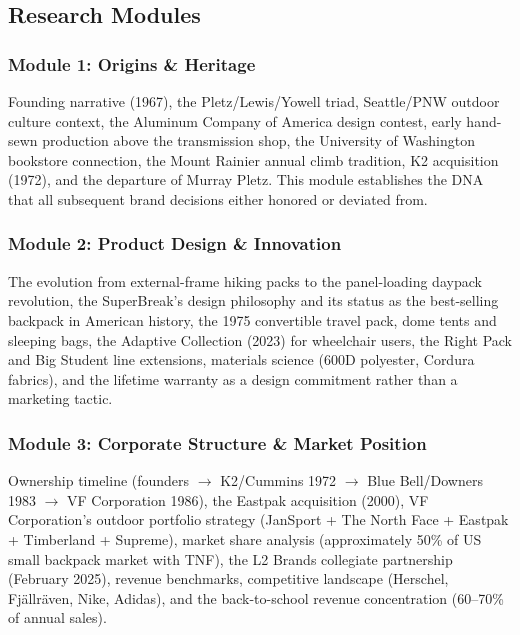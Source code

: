 \documentclass[11pt,letterpaper]{article}
\begin{document}
\subsection{Research Modules}

\subsubsection{Module 1: Origins \& Heritage}

Founding narrative (1967), the Pletz/Lewis/Yowell triad, Seattle/PNW outdoor culture context, the Aluminum Company of America design contest, early hand-sewn production above the transmission shop, the University of Washington bookstore connection, the Mount Rainier annual climb tradition, K2 acquisition (1972), and the departure of Murray Pletz. This module establishes the DNA that all subsequent brand decisions either honored or deviated from.

\subsubsection{Module 2: Product Design \& Innovation}

The evolution from external-frame hiking packs to the panel-loading daypack revolution, the SuperBreak's design philosophy and its status as the best-selling backpack in American history, the 1975 convertible travel pack, dome tents and sleeping bags, the Adaptive Collection (2023) for wheelchair users, the Right Pack and Big Student line extensions, materials science (600D polyester, Cordura fabrics), and the lifetime warranty as a design commitment rather than a marketing tactic.

\subsubsection{Module 3: Corporate Structure \& Market Position}

Ownership timeline (founders $\rightarrow$ K2/Cummins 1972 $\rightarrow$ Blue Bell/Downers 1983 $\rightarrow$ VF Corporation 1986), the Eastpak acquisition (2000), VF Corporation's outdoor portfolio strategy (JanSport + The North Face + Eastpak + Timberland + Supreme), market share analysis (approximately 50\% of US small backpack market with TNF), the L2 Brands collegiate partnership (February 2025), revenue benchmarks, competitive landscape (Herschel, Fjällräven, Nike, Adidas), and the back-to-school revenue concentration (60--70\% of annual sales).
\end{document}
